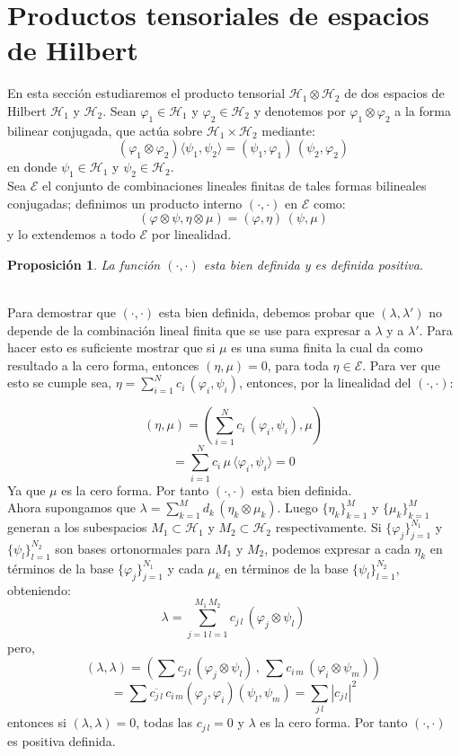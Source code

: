 \documentclass[12pt]{book}
\numberwithin{equation}{chapter}
\newtheorem{proposition}[theorem]{Proposici\'on}
\def\n{\noindent}
\def\ol{\overline}
\def\E{\mathcal{E}}
\def\la{\langle}
\def\ra{\rangle}
\def\H{\mathcal{H}}
\def\pr{\otimes}
\def\vp{\varphi}
\begin{document}
\section{Productos tensoriales de espacios de Hilbert}
En esta secci\'on estudiaremos el producto tensorial $\H_{1} \pr \H_{2}$ de dos espacios de Hilbert $\H_{1}$ y $\H_{2}$. Sean $ \vp_{1} \in \H_{1} $ y $ \vp_{2} \in \H_{2} $ y denotemos por $ \vp_{1} \pr \vp_{2} $ a la forma bilinear conjugada, que act\'ua sobre $ \H_{1} \times \H_{2} $ mediante:
$$ (\vp_{1} \pr \vp_{2}) \la \psi_{1},\psi_{2} \ra= ( \psi_{1},\vp_{1} )\,( \psi_{2},\vp_{2} ) $$ 
en donde $\psi_{1} \in \H_{1}$ y $\psi_{2} \in \H_{2}$.\\

Sea $\E$ el conjunto de combinaciones lineales finitas de tales formas bilineales conjugadas; definimos un producto interno $(\cdot,\cdot)$ en $\E$ como:
$$ (\vp \pr \psi , \eta \pr \mu )= (\vp,\eta) \, ( \psi , \mu ) $$
y lo extendemos a todo $\E$ por linealidad.

\begin{proposition}
La funci\'on $(\cdot , \cdot)$ esta bien definida y es definida positiva.
\end{proposition}
\n {\bf Demostraci\'on}\\
Para demostrar que $(\cdot , \cdot)$ esta bien definida, debemos probar que $( \lambda , \lambda' )$ no depende de la combinaci\'on lineal finita que se use para expresar a $\lambda$ y a $\lambda'$. Para hacer esto es suficiente mostrar que si $\mu$ es una suma finita la cual da como resultado a la cero forma, entonces $(\eta , \mu)=0$, para toda $ \eta \in \E $. Para ver que esto se cumple sea, $ \eta = \sum_{i=1}^{N} c_{i} \, ( \vp_{i} , \psi_{i} ) $, entonces, por la linealidad del $( \cdot , \cdot )$:

$$ ( \eta,\mu  )= \left( \sum_{i=1}^{N} c_{i}\,( \vp_{i} , \psi_{i} ) , \mu \right)  $$
$$ = \sum_{i=1}^{N} c_{i} \, \mu \, \la \vp_{i},\psi_{i} \ra =0$$
Ya que $\mu$ es la cero forma. Por tanto $ (\cdot , \cdot ) $ esta bien definida.\\
Ahora supongamos que $ \lambda = \sum_{k=1}^{M} d_{k}\, ( \eta_{k} \pr \mu_{k} ) $. Luego $\{ \eta_{k} \}_{k=1}^{M}$ y $\{ \mu_{k} \}_{k=1}^{M}$ generan a los subespacios $M_{1} \subset \H_{1} $ y $ M_{2} \subset \H_{2} $ respectivamente. Si $\{ \vp_{j} \}_{j=1}^{N_{1}}$ y $\{ \psi_{l} \}_{l=1}^{N_{2}}$ son bases ortonormales para $M_{1}$ y $M_{2}$, podemos expresar a cada $\eta_{k}$ en t\'erminos de la base $\{ \vp_{j} \}_{j=1}^{N_{1}}$ y cada $\mu_{k}$ en t\'erminos de la base $\{ \psi_{l} \}_{l=1}^{N_{2}}$, obteniendo:
$$ \lambda = \sum_{j=1 \, l=1}^{M_{1}\, M_{2}} c_{j\,l}\, ( \vp_{j} \pr \psi_{l} ) $$
pero,
$$ ( \lambda , \lambda )= \left( \sum c_{j\,l}\,(\vp_{j} \pr \psi_{l}) \,,\, \sum c_{i\,m}\,(\vp_{i} \pr \psi_{m})  \right) $$
$$ = \sum \ol{c_{j\,l}} \, c_{i\,m} (\vp_{j},\vp_{i})(\psi_{l} , \psi_{m})= \sum_{j\,l} |c_{j\,l}|^{2} $$
entonces si $( \lambda , \lambda )=0$, todas las $c_{j\,l}=0$ y $\lambda$ es la cero forma. Por tanto $ ( \cdot , \cdot ) $ es positiva definida.
\end{document}
